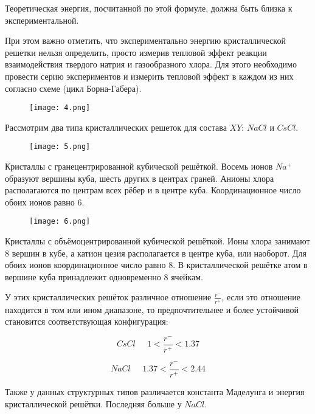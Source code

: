 Теоретическая энергия, посчитанной по этой формуле, должна
быть близка к экспериментальной.

При этом важно отметить, что экспериментально энергию
кристаллической решетки нельзя определить, просто измерив
тепловой эффект реакции взаимодействия твердого натрия и
газообразного хлора. Для этого необходимо провести серию
экспериментов и измерить тепловой эффект в каждом из них
согласно схеме (цикл Борна-Габера).

\par\smallskip

\begin{figure}[H]
	\centering
	{\texttt{[image: 4.png]}}
\end{figure}

\par\smallskip	

Рассмотрим два типа кристаллических решеток для состава $XY$:
$NaCl$ и $CsCl$.

\par\smallskip

\begin{figure}[H]
	\centering
	{\texttt{[image: 5.png]}}
\end{figure}

\par\smallskip

Кристаллы с гранецентрированной кубической решёткой. Восемь
ионов $Na^+$ образуют вершины куба, шесть других в центрах граней.
Анионы хлора располагаются по центрам всех рёбер и в центре
куба. Координационное число обоих ионов равно $6$.

\par\smallskip

\begin{figure}[h]
	\centering
	{\texttt{[image: 6.png]}}
\end{figure}

\par\smallskip

Кристаллы с объёмоцентрированной кубической решёткой. Ионы
хлора занимают $8$ вершин в кубе, а катион цезия располагается в
центре куба, или наоборот. Для обоих ионов координационное
число равно $8$. В кристаллической решётке атом в вершине куба
принадлежит одновременно $8$ ячейкам. 

\par\smallskip

У этих кристаллических решёток различное отношение $\frac{r^-}{r^+}$, если
это отношение находится в том или ином диапазоне, то
предпочтительнее и более устойчивой становится соответствующая
конфигурация:

$$CsCl \;\;\;\;\; 1<\frac{r^-}{r^+}<1.37$$

$$NaCl \;\;\;\;\; 1.37<\frac{r^-}{r^+}<2.44$$


Также у данных структурных типов различается константа
Маделунга и энергия кристаллической решётки. Последняя больше
у $NaCl$.
	
\par\bigskip
\par\bigskip